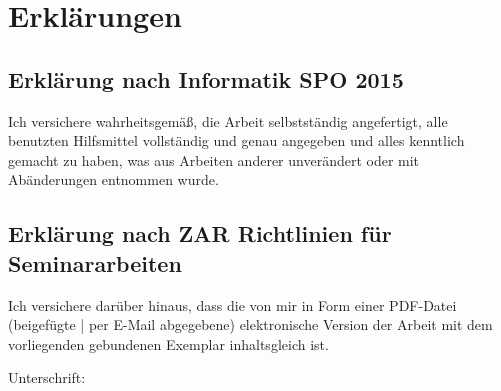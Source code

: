 \newpage
\section{Erklärungen}
\subsection{Erklärung nach Informatik SPO 2015}
Ich  versichere  wahrheitsgemäß,  die  Arbeit  selbstständig  angefertigt,  alle  benutzten  Hilfsmittel  vollständig  und  genau  angegeben  und  alles  kenntlich  gemacht  zu  haben, was  aus  Arbeiten  anderer  unverändert  oder  mit  Abänderungen  entnommen  wurde.
\subsection{Erklärung nach ZAR Richtlinien für Seminararbeiten}
Ich versichere darüber hinaus, dass die von mir in Form einer PDF-Datei (beigefügte | per E-Mail abgegebene) elektronische Version der Arbeit mit dem vorliegenden gebundenen Exemplar inhaltsgleich ist.

\vfill
\hspace{5cm} Unterschrift: \hrulefill